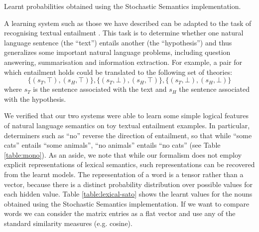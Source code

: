\documentclass[manuscript]{clv2}
\begin{document}
\begin{table}
  \centering


  \vspace{0.2cm}
  \caption{Learnt probabilities obtained using the
    Stochastic Semantics implementation.}
  \label{table:lexical-sato}
\end{table}

A learning system such as those we have described can be adapted to
the task of recognising textual entailment \cite{Dagan:05}. This task is
to determine whether one natural language sentence (the ``text'')
entails another (the ``hypothesis'') and thus generalizes some
important natural language problems, including question answering,
summarisation and information extraction.  For example, a pair for
which entailment holds could be translated to the following set of
theories:
\[
\{(s_T,\top),(s_H,\top)\},  \{(s_T,\bot),(s_H,\top)\},\{(s_T,\bot),(s_H,\bot)\}
\]
where $s_T$ is the sentence associated with the text and $s_H$ the
sentence associated with the hypothesis.


We verified that our two systems were able to learn some simple
logical features of natural language semantics on toy textual
entailment examples. In particular, determiners such as ``no''
reverse the direction of entailment, so that while ``some cats''
entails ``some animals'', ``no animals'' entails ``no cats'' (see Table
\ref{table:mono}). As an aside, we note that while our formalism does not employ explicit representations of lexical semantics, such representations can be recovered from the learnt models. The representation of a word is a tensor rather than a vector, because there is a distinct probability distribution over possible values for each hidden value. Table \ref{table:lexical-sato} shows the learnt values for the nouns obtained using the Stochastic Semantics implementation. 
If we want to compare words 
we can consider the matrix entries as a
flat vector and use any of the standard similarity measures (e.g. 
cosine).
\end{document}
